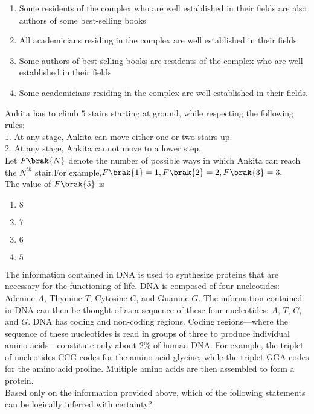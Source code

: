     \begin{enumerate}
        \item Some residents of the complex who are well established in their fields are also authors of some best-selling books
        \item All academicians residing in the complex are well established in their fields
        \item Some authors of best-selling books are residents of the complex who are well established in their fields
        \item Some academicians residing in the complex are well established in their fields.
    \end{enumerate}
    \item Ankita has to climb $5$ stairs starting at ground, while respecting the following rules:\\
    $1.$ At any stage, Ankita can move either one or two stairs up.\\
    $2.$ At any stage, Ankita cannot move to a lower step.\\
    Let $F\brak{N}$ denote the number of possible ways in which Ankita can reach the $N^{th}$ stair.For example,$F\brak{1}=1,F\brak{2}=2,F\brak{3}=3.$\\
    The value of $F\brak{5}$ is
    \begin{enumerate}
        \item $8$
        \item $7$
        \item $6$
        \item $5$\\
    \end{enumerate}
   \item The information contained in DNA is used to synthesize proteins that are necessary for the functioning of life. DNA is composed of four nucleotides: Adenine $A$, Thymine $T$, Cytosine $C$, and Guanine $G$. The information contained in DNA can then be thought of as a sequence of these four nucleotides: $A$, $T$, $C$, and $G$. DNA has coding and non-coding regions. Coding regions—where the sequence of these nucleotides is read in groups of three to produce individual amino acids—constitute only about $2\%$ of human DNA. For example, the triplet of nucleotides CCG codes for the amino acid glycine, while the triplet GGA codes for the amino acid proline. Multiple amino acids are then assembled to form a protein.\\
    Based only on the information provided above, which of the following statements can be logically inferred with certainty?\\

